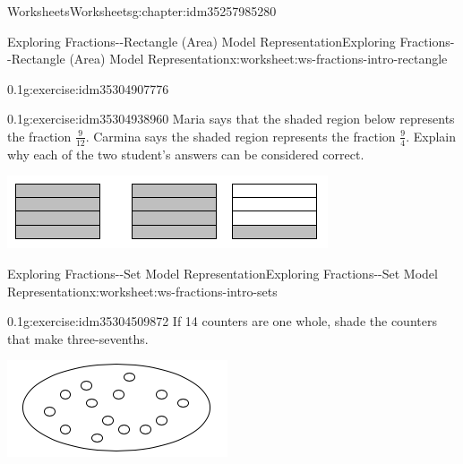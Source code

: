 \documentclass[twoside,11pt,]{book}
\begin{document}
\begin{chapterptx}{Worksheets}{}{Worksheets}{}{}{g:chapter:idm35257985280}
\begin{worksheet-section-numberless}{Exploring Fractions-{}-{}Rectangle (Area) Model Representation}{}{Exploring Fractions-{}-{}Rectangle (Area) Model Representation}{}{}{x:worksheet:ws-fractions-intro-rectangle}
\begin{divisionexercise}{4}{}{0.1}{g:exercise:idm35304907776}
\begin{sidebyside}{1}{0.3}{0.3}{0}
\begin{sbspanel}{0.4}
\end{sbspanel}%
\end{sidebyside}%
%
\end{divisionexercise}%
\begin{divisionexercise}{5}{}{0.1}{g:exercise:idm35304938960}%
Maria says that the shaded region below represents the fraction \(\frac{9}{12} \). Carmina says the shaded region represents the fraction \(\frac{9}{4} \). Explain why each of the two student’s answers can be considered correct. \begin{sidebyside}{1}{0.25}{0.25}{0}%
\begin{sbspanel}{0.5}%
\includegraphics[width=1\linewidth]{images/nine-fourths-vs-twelfths.png}
\end{sbspanel}%
\end{sidebyside}%
%
\end{divisionexercise}%
\end{worksheet-section-numberless}
\restoregeometry
%
%
\typeout{************************************************}
\typeout{************************************************}
%
\begin{worksheet-section-numberless}{Exploring Fractions-{}-{}Set Model Representation}{}{Exploring Fractions-{}-{}Set Model Representation}{}{}{x:worksheet:ws-fractions-intro-sets}
\begin{divisionexercise}{1}{}{0.1}{g:exercise:idm35304509872}%
If 14 counters are one whole, shade the counters that make three-sevenths. \begin{sidebyside}{1}{0.35}{0.35}{0}%
\begin{sbspanel}{0.3}%
\includegraphics[width=1\linewidth]{images/fourteen-counters.png}

\end{sbspanel}
\end{sidebyside}
\end{divisionexercise}
\end{worksheet-section-numberless}
\end{chapterptx}
\end{document}

